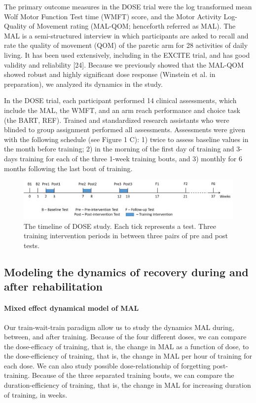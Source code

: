 The primary outcome measures in the DOSE trial were the log transformed mean Wolf Motor Function Test time (WMFT) score, and the Motor Activity Log-Quality of Movement rating (MAL-QOM; henceforth referred as MAL). 
The MAL is a semi-structured interview in which participants are asked to recall and rate the quality of movement (QOM) of the paretic arm for 28 activities of daily living. 
It has been used extensively, including in the EXCITE trial, and has good validity and reliability [24]. 
Because we previously showed that the MAL-QOM showed robust and highly significant dose response (Winstein et al. in preparation), we analyzed its dynamics in the study.

In the DOSE trial, each participant performed 14 clinical assessments, which include the MAL, the WMFT, and an arm reach performance and choice task (the BART, REF). 
Trained and standardized research assistants who were blinded to group assignment performed all assessments. 
Assessments were given with the following schedule (see Figure 1 C): 1) twice to assess baseline values in the month before training; 2) in the morning of the first day of training and 3-days training for each of the three 1-week training bouts, and 3) monthly for 6 months following the last bout of training.  

\begin{figure}
	\centering
	\includegraphics[width=1\linewidth]{figures/dosetimeline}
	\caption[DOSE Study Timeline]{The timeline of DOSE study. Each tick represents a test. Three training intervention periods in between three pairs of pre and post tests.}
	\label{fig:dosetimeline}
\end{figure}


\subsection{Modeling the dynamics of recovery during and after rehabilitation}
\paragraph{Mixed effect dynamical model of MAL}
Our train-wait-train paradigm allow us to study the dynamics MAL during, between, and after training. 
Because of the four different doses, we can compare the dose-efficacy of training, that is, the change in MAL as a function of dose, to the dose-efficiency of training, that is, the change in MAL per hour of training for each dose. 
We can also study possible dose-relationship of forgetting post-training. 
Because of the three separated training bouts, we can compare the duration-efficiency of training, that is, the change in MAL for increasing duration of training, in weeks.  

